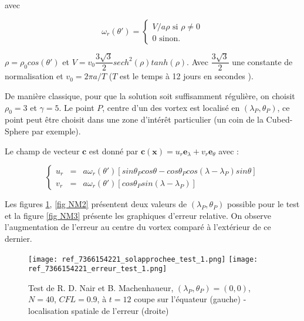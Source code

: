 avec

\begin{equation}
\label{rotation_r}
\omega_r(\theta') = \left\lbrace
\begin{array}{ll}
V/a\rho \text{ si } \rho \neq 0\\
0 \text{ sinon.}
\end{array}
\right.
\end{equation}

$\rho = \rho_0 cos ( \theta' )$ et $V =v_0 \dfrac{3 \sqrt{3}}{2} sech^2 ( \rho )  tanh( \rho )$. Avec $\dfrac{3 \sqrt{3}}{2}$ une constante de normalisation et $v_0 = 2 \pi a / T$ ($T$ est le temps à 12 jours en secondes ).

De manière classique, pour que la solution soit suffisamment régulière, on choisit $\rho_0 = 3$ et $\gamma = 5$.
Le point $P$, centre d'un des vortex est localisé en $( \lambda_P, \theta_P)$, ce point peut être choisit dans une zone d'intérêt particulier (un coin de la Cubed-Sphere par exemple).

Le champ de vecteur $\mathbf{c}$ est donné par $\mathbf{c}( \mathbf{x} ) = u_r \mathbf{e}_{\lambda} + v_r \mathbf{e}_{\theta}$ avec :

\begin{equation}
\left\lbrace
\begin{array}{rcl}
u_r & = & a \omega_r ( \theta' ) \left[ sin \theta_P cos \theta - cos \theta_P cos( \lambda - \lambda_P ) sin \theta \right] \\
v_r & = & a \omega_r ( \theta' ) \left[ cos \theta_P sin ( \lambda - \lambda_P) \right]
\end{array}
\right.
\end{equation}

Les figures \ref{fig NM1}, \ref{fig NM2} présentent deux valeurs de $(\lambda_P, \theta_P)$ possible pour le test et la figure \ref{fig NM3} présente les graphiques d'erreur relative. On observe l'augmentation de l'erreur au centre du vortex comparé à l'extérieur de ce dernier.

\begin{figure}[ht]
\begin{center}
\texttt{[image: ref\_7366154221\_solapprochee\_test\_1.png]}
\texttt{[image: ref\_7366154221\_erreur\_test\_1.png]}
\caption{Test de R. D. Nair et B. Machenhaueur, $(\lambda_P, \theta_P) = (0,0)$, $N=40$, $CFL=0.9$, à $t=12$ coupe sur l'équateur (gauche) - localisation spatiale de l'erreur (droite)}
\label{fig NM1}
\end{center}
\end{figure}

